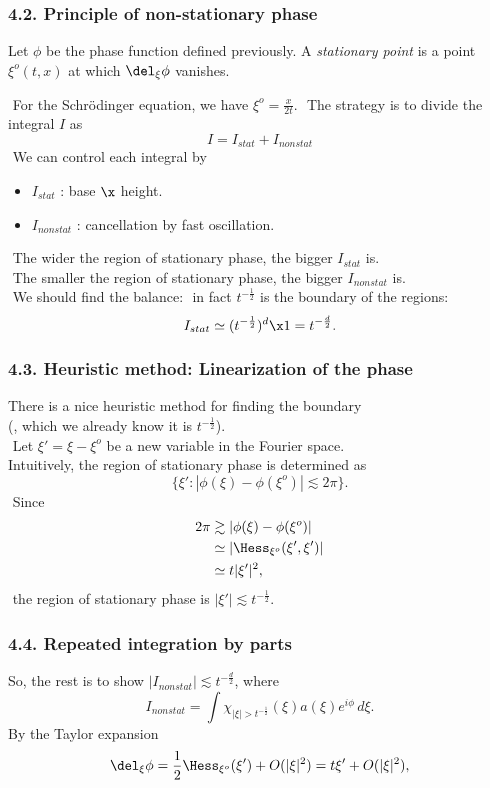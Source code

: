 \documentclass[8pt]{beamer}
\begin{document}
\begin{frame}
\frametitle{4.2. Principle of non-stationary phase}
\begin{defn}
Let $\phi$ be the phase function defined previously.
A \emph{stationary point} is a point $\xi^o(t,x)$ at which $\del_\xi\phi$ vanishes.
\end{defn}
${}$ For the Schr\"odinger equation, we have $\xi^o=\frac x{2t}$.
${}$ The strategy is to divide the integral $I$ as
\[\boxed{I=I_{stat}+I_{nonstat}}\]
${}$
We can control each integral by
\begin{itemize}
\item $I_{stat}$ : base $\x$ height.
\item $I_{nonstat}$ : cancellation by fast oscillation.
\end{itemize}
${}$ The wider the region of stationary phase, the bigger $I_{stat}$ is.\\
${}$ The smaller the region of stationary phase, the bigger $I_{nonstat}$ is.\noindent\\[1em]
${}$ We should find the balance: ${}$ in fact $t^{-\frac 12}$ is the boundary of the regions:
\[I_{stat}\simeq (t^{-\frac12})^d\x1=t^{-\frac d2}.\]
\end{frame}


\begin{frame}
\frametitle{4.3. Heuristic method: Linearization of the phase}
There is a nice heuristic method for finding the boundary\\
(, which we already know it is $t^{-\frac 12}$).\\[1em]
${}$ Let $\xi'=\xi-\xi^o$ be a new variable in the Fourier space.\\
Intuitively, the region of stationary phase is determined as
\[\{\xi':|\phi(\xi)-\phi(\xi^o)|\lesssim2\pi\}.\]
${}$ Since
\begin{align*}
2\pi&\gtrsim|\phi(\xi)-\phi(\xi^o)|\\
&\simeq|\Hess_{\xi^o}(\xi',\xi')|\\
&\simeq t|\xi'|^2,
\end{align*}
${}$ the region of stationary phase is $|\xi'|\lesssim t^{-\frac12}$.
\end{frame}

\begin{frame}
\frametitle{4.4. Repeated integration by parts}
So, the rest is to show $|I_{nonstat}|\lesssim t^{-\frac d2}$, where
\[I_{nonstat}=\int\chi_{|\xi|>t^{-\frac12}}(\xi)a(\xi)e^{i\phi}\,d\xi.\]
By the Taylor expansion
\[\del_\xi\phi=\frac12\Hess_{\xi^o}(\xi')+O(|\xi|^2)=t\xi'+O(|\xi|^2),\]

\end{frame}
\end{document}
